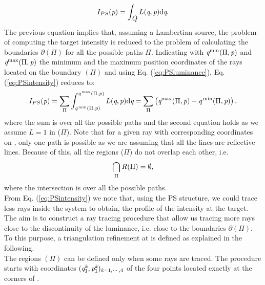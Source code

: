 \begin{equation}
\label{eq:PSintensity}
I_{PS}(\textit{p}) = \int_{\mbox{$\emph{Q}_{\textit{}}$}}L(\textit{q}, \textit{p}) \textrm{d}\textit{q}.
\end{equation}
The previous equation implies that, assuming a Lambertian source, the problem of computing the target intensity is reduced to the problem of calculating the boundaries
$\partial$$(\Pi)$ for all the possible paths $\Pi$. Indicating with $\textit{q}^\textrm{min}(\Pi,\textit{p})$ and $\textit{q}^\textrm{max}(\Pi,\textit{p})$ the minimum and the maximum position coordinates of the rays located on the boundary $(\Pi)$ and using Eq. (\ref{eq:PSluminance}), Eq. (\ref{eq:PSintensity}) reduces to:
\begin{equation}\label{eta2}
I_{PS}(\textit{p}) = \sum_{\Pi}\int_{\textit{q}^\textrm{\,min}(\Pi, \textit{p})}^{\textit{q}^\textrm{\,max}(\Pi,\textit{p})}L(\textit{q}, \textit{p})\textrm{d}\textit{q} = \sum_{\Pi}\big (\textit{q}^\textrm{max}(\Pi,\textit{p})-\textit{q}^\textrm{\,min}(\Pi,\textit{p})\big )\,,
\end{equation}
where the sum is over all the possible paths and the second equation holds as we assume $L=1$ in ($\Pi$).
Note that for a given ray with corresponding coordinates
on , only one path is possible as we are assuming that all the lines are reflective lines.
Because of this, all the regions ($\Pi$) do not overlap each other, i.e.
\begin{equation}
\bigcap_{\Pi}\mbox{$\emph{R}_{\textit{}}$}(\Pi)= \emptyset,
\end{equation}
where the intersection is over all the possible paths. \\ \indent
From Eq. (\ref{eq:PSintensity}) we note that, using the PS structure, we could trace less rays inside the system to obtain, the profile of the intensity at the target.
The aim is to construct a ray tracing procedure that allow us tracing more rays close to the discontinuity of the luminance, i.e. close to the boundaries $\partial$$(\Pi)$.
To this purpose, a triangulation refinement at  is defined as explained in the following. \\ \indent
The regions $(\Pi)$ can be defined only when some rays are traced.
The procedure starts with coordinates $(\textit{q}_1^{\textit{k}},\textit{p}_1^{\textit{k}})_{\textit{k}=1, \cdots, 4}$ of the four points located exactly at the corners of .
